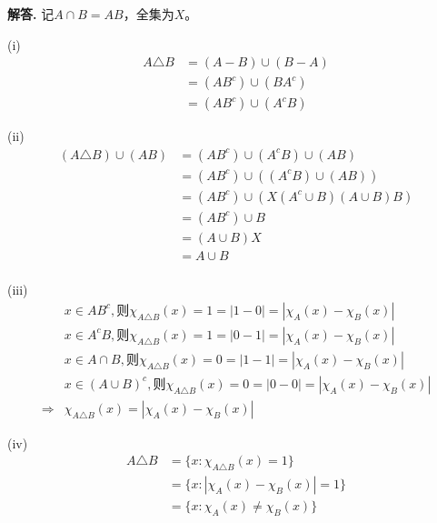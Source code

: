 \documentclass[12pt, a4paper, oneside]{ctexart}
\newenvironment{solution}{\par\noindent\textbf{解答. }}{\bigskip\par}
\begin{document}
\begin{solution}
    记$A\cap B = AB$，全集为$X$。

    (i)
    \begin{equation*}
        \begin{aligned}
            A\triangle B &= (A-B)\cup (B-A)\\
            &= (A B^c)\cup(B A^c)\\
            &= (A B^c)\cup(A^c B)
        \end{aligned}
    \end{equation*}

    (ii) 
    \begin{equation*}
        \begin{aligned}
            (A\triangle B)\cup(AB) &= (AB^c)\cup(A^cB)\cup(AB)\\
            &= (AB^c)\cup\left((A^cB)\cup(AB)\right)\\
            &= (AB^c)\cup\left(X(A^c\cup B)(A\cup B)B\right)\\
            &= (AB^c)\cup B\\
            &= (A\cup B)X\\
            &= A\cup B\\
        \end{aligned}
    \end{equation*}

    (iii) \begin{equation*}
        \begin{aligned}
            &x\in AB^c, \text{则} \chi_{A\triangle B}(x) = 1 = |1-0| = |\chi_A(x)-\chi_B(x)|\\
            &x\in A^cB, \text{则} \chi_{A\triangle B}(x) = 1 = |0-1| = |\chi_A(x)-\chi_B(x)|\\
            &x\in A\cap B, \text{则} \chi_{A\triangle B}(x) = 0 = |1-1| = |\chi_A(x)-\chi_B(x)|\\
            &x\in (A\cup B)^c, \text{则} \chi_{A\triangle B}(x) = 0 = |0-0| = |\chi_A(x)-\chi_B(x)|\\
            \Rightarrow & 
            \chi_{A\triangle B}(x) = |\chi_A(x)-\chi_B(x)|
        \end{aligned}
    \end{equation*}
    
    (iv) \begin{equation*}
        \begin{aligned}
            A\triangle B &= \{x:\chi_{A\triangle B}(x) = 1\}\\
            &= \{x:|\chi_A(x)-\chi_B(x)| = 1\}\\
            &= \{x:\chi_A(x)\neq \chi_B(x)\}
        \end{aligned}
    \end{equation*}
\end{solution}
\end{document}
